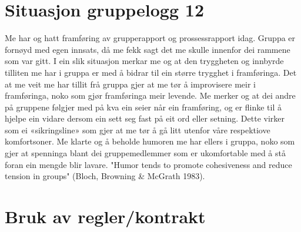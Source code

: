 \section{Situasjon gruppelogg 12}
Me har og hatt framføring av grupperapport og prossessrapport idag. Gruppa er fornøyd med egen innsats, då me fekk sagt det me skulle innenfor dei rammene som var gitt. I ein slik situasjon merkar me og at den tryggheten og innbyrde tilliten me har i gruppa er med å bidrar til ein større trygghet i framføringa. Det at me veit me har tillit frå gruppa gjer at me tør å improvisere meir i framføringa, noko som gjør framføringa meir levende. Me merker og at dei andre på gruppene følgjer med på kva ein seier når ein framføring, og er flinke til å hjelpe ein vidare dersom ein sett seg fast på eit ord eller setning. Dette virker som ei «sikringsline» som gjer at me tør å gå litt utenfor våre respektiove komfortsoner.  Me klarte og å beholde humoren me har ellers i gruppa, noko som gjer at spenninga blant dei gruppemedlemmer som er ukomfortable med å stå foran ein mengde blir lavare. "Humor tends to promote cohesiveness and reduce tension in groups" (Bloch, Browning \& McGrath 1983).

\section{Bruk av regler/kontrakt}

